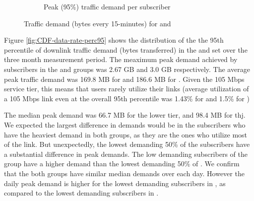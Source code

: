 \begin{figure}[t]
\begin{minipage}{1\linewidth}
\begin{subfigure}[b]{1\linewidth}
                \caption{Peak (95\%) traffic demand per subscriber\label{fig:CDF-data-rate-daily-perc95}}
 \end{subfigure}
%
\end{minipage}
\caption{Traffic demand (bytes every 15-minutes) for \control{} and \treatment{}\label{fig:traffic-demand-cdf}}
\end{figure}

Figure \ref{fig:CDF-data-rate-perc95} shows the distribution of the
the 95th percentile of downlink traffic demand (bytes transferred)
in the \treatment{} and \control{} set
over the three month measurement period. The meaximum peak
demand achieved by subscribers in the \control{} and \treatment{}
groups was 2.67 GB and 3.0 GB respectively. The average peak traffic
demand was 169.8 MB for \control{} and 186.6 MB for \treatment{}.
Given the 105 Mbps service tier, this means that users rarely utilize
their links (average utilization of a 105 Mbps link even at the
overall 95th percentile was 1.43\% for \control{} and 1.5\% for \treatment{})

The median peak demand was 66.7 MB for the lower tier, and
98.4 MB for thj. We expected the largest difference
in demands would be in the subscribers who have the heaviest demand in
both groups, as they are the ones who utilize most of the link.
But unexpectedly, the lowest demanding 50\% of the subscribers have
a substantial difference in peak demands. The low demanding subscribers
of the \treatment{} group have a higher demand than the lowest demanding 50\% of
\control{}. We confirm that the both groups have similar median demands over each day. However
the daily peak demand is higher for the lowest demanding subscribers in
 \treatment{}, as compared to the lowest demanding subscribers in \control{}.


